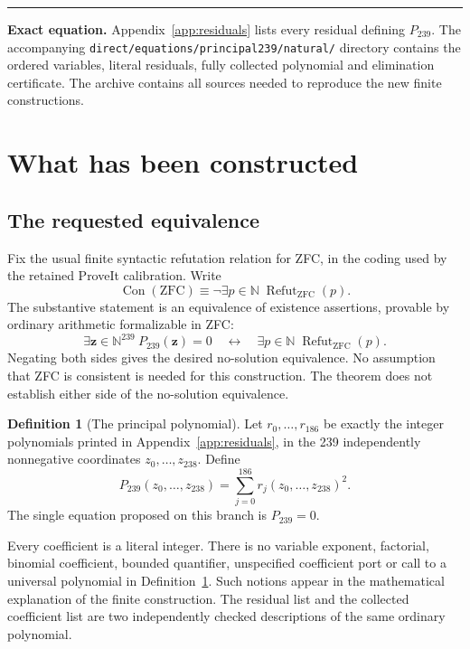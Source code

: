 \documentclass[11pt]{article}
\theoremstyle{definition}\newtheorem{definition}[theorem]{Definition}
\theoremstyle{remark}\newtheorem{remark}[theorem]{Remark}
\newcommand{\N}{\mathbb N}\newcommand{\Z}{\mathbb Z}\newcommand{\Q}{\mathbb Q}
\newcommand{\Con}{\operatorname{Con}}\newcommand{\Refut}{\operatorname{Refut}}
\newcommand{\code}[1]{\nolinkurl{#1}}
\begin{document}
\vspace{5pt}\hrule\vspace{7pt}
\textbf{Exact equation.} Appendix~\ref{app:residuals} lists every residual defining $P_{239}$. The accompanying \code{direct/equations/principal239/natural/} directory contains the ordered variables, literal residuals, fully collected polynomial and elimination certificate. The archive contains all sources needed to reproduce the new finite constructions.
\newpage
\begingroup\small\setlength{\parskip}{0pt}\tableofcontents\endgroup
\newpage

\section{What has been constructed}

\subsection{The requested equivalence}

Fix the usual finite syntactic refutation relation for ZFC, in the coding used by the retained ProveIt calibration. Write
\[
 \Con(\mathrm{ZFC})\equiv\neg\exists p\in\N\;\Refut_{\mathrm{ZFC}}(p).
\]
The substantive statement is an equivalence of existence assertions, provable by ordinary arithmetic formalizable in ZFC:
\begin{equation}\label{eq:existence}
 \exists\mathbf z\in\N^{239}\ P_{239}(\mathbf z)=0
 \quad\longleftrightarrow\quad
 \exists p\in\N\;\Refut_{\mathrm{ZFC}}(p).
\end{equation}
Negating both sides gives the desired no-solution equivalence. No assumption that ZFC is consistent is needed for this construction. The theorem does not establish either side of the no-solution equivalence.

\begin{definition}[The principal polynomial]\label{def:principal}
Let $r_0,\ldots,r_{186}$ be exactly the integer polynomials printed in Appendix~\ref{app:residuals}, in the 239 independently nonnegative coordinates $z_0,\ldots,z_{238}$. Define
\begin{equation}\label{eq:principal}
 \boxed{\displaystyle P_{239}(z_0,\ldots,z_{238})=\sum_{j=0}^{186}r_j(z_0,\ldots,z_{238})^2.}
\end{equation}
The single equation proposed on this branch is $P_{239}=0$.
\end{definition}

Every coefficient is a literal integer. There is no variable exponent, factorial, binomial coefficient, bounded quantifier, unspecified coefficient port or call to a universal polynomial in Definition~\ref{def:principal}. Such notions appear in the mathematical explanation of the finite construction. The residual list and the collected coefficient list are two independently checked descriptions of the same ordinary polynomial.
\end{document}
